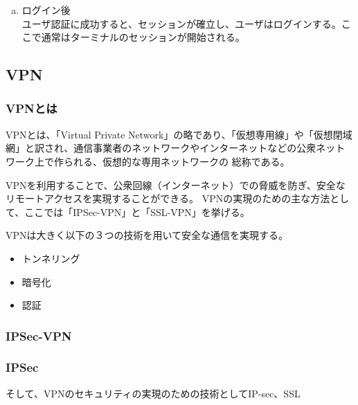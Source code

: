 \documentclass[12pt,a4paper,titlepage]{jsarticle}
\begin{document}
\begin{enumerate}[(a)]
\begin{enumerate}[(1)]
    \end{enumerate}
    \item ログイン後\mbox{}\\
    ユーザ認証に成功すると、セッションが確立し、ユーザはログインする。ここで通常はターミナルのセッションが開始される。
    
\end{enumerate}






\subsection{VPN}\label{aboutVPN}

\subsubsection*{VPNとは}
VPNとは、「Virtual Private Network」の略であり、「仮想専用線」や「仮想閉域網」と訳され、通信事業者のネットワークやインターネットなどの公衆ネットワーク上で作られる、仮想的な専用ネットワークの
総称である。


VPNを利用することで、公衆回線（インターネット）での脅威を防ぎ、安全なリモートアクセスを実現することができる。
VPNの実現のための主な方法として、ここでは「IPSec-VPN」と「SSL-VPN」を挙げる。

VPNは大きく以下の３つの技術を用いて安全な通信を実現する。
\begin{itemize}
    \item トンネリング
    \item 暗号化
    \item 認証
\end{itemize}
\subsubsection*{IPSec-VPN}

\subsubsection*{IPSec}




そして、VPNのセキュリティの実現のための技術としてIP-sec、SSL
\end{document}
